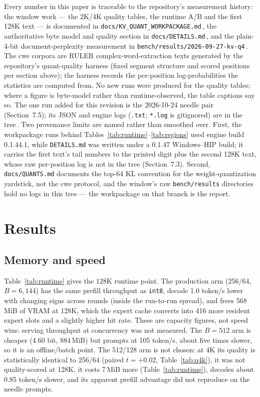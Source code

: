 \documentclass[10pt,twocolumn]{article}
\begin{document}
Every number in this paper is traceable to the repository's measurement history: the window work --- the 2K/4K quality tables, the runtime A/B and the first 128K text --- is documented in \texttt{docs/KV\_QUANT\_WORKPACKAGE.md}\,\cite{strata-wp}, the authoritative byte model and quality section in \texttt{docs/DETAILS.md}\,\cite{strata-details}, and the plain-4-bit document-perplexity measurement in \texttt{bench/results/2026-09-27-kv-q4}\,\cite{strata-kv4}. The cwe corpora are RULER complex-word-extraction texts generated by the repository's quant-quality harness (fixed segment structure and scored positions per section above); the harness records the per-position log-probabilities the statistics are computed from. No new runs were produced for the quality tables; where a figure is byte-model rather than runtime-observed, the table captions say so. The one run added for this revision is the 2026-10-24 needle pair (Section~7.5); its JSON and engine logs (\texttt{.txt}; \texttt{*.log} is gitignored) are in the tree\,\cite{strata-needle24}. Two provenance limits are named rather than smoothed over. First, the workpackage runs behind Tables~\ref{tab:runtime}--\ref{tab:regions} used engine build 0.1.44.1, while \texttt{DETAILS.md} was written under a 0.1.47 Windows--HIP build; it carries the first text's tail numbers to the printed digit plus the second 128K text, whose raw per-position log is not in the tree (Section~7.3). Second, \texttt{docs/QUANTS.md} documents the top-64 KL convention for the weight-quantization yardstick, not the cwe protocol, and the window's raw \texttt{bench/results} directories hold no logs in this tree --- the workpackage on that branch is the report.

\section{Results}

\subsection{Memory and speed}

Table~\ref{tab:runtime} gives the 128K runtime point. The production arm (256/64, $B{=}6{,}144$) has the same prefill throughput as \texttt{int8}, decode 1.0 token/s lower with changing signs across rounds (inside the run-to-run spread), and frees 568\,MiB of VRAM at 128K, which the expert cache converts into 416 more resident expert slots and a slightly higher hit rate. These are capacity figures, not speed wins: serving throughput at concurrency was not measured. The $B{=}512$ arm is cheaper (4.60 bit, 884\,MiB) but prompts at 105 token/s, about five times slower, so it is an offline/batch point. The 512/128 arm is not chosen: at 4K its quality is statistically identical to 256/64 (paired $t{=}{+}0.02$, Table~\ref{tab:q4k}), it was not quality-scored at 128K, it costs 7\,MiB more (Table~\ref{tab:runtime}), decodes about 0.85 token/s slower, and its apparent prefill advantage did not reproduce on the needle prompts.
\end{document}
